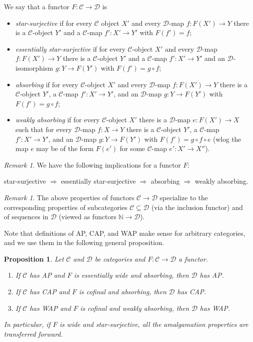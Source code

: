 \documentclass[oneside,notitlepage,12pt]{article}
\newtheorem{prop}[tw]{Proposition}
\theoremstyle{definition}
\theoremstyle{remark}
\newtheorem{uwgi}[tw]{Remark}
\newcommand \maps {\colon} %
\newcommand \cmp {\circ} %
\newcommand \N {\mathbb{N}}
\newcommand \C {\mathscr{C}}
\newcommand \D {\mathscr{D}}
\begin{document}
\noindent
We say that a functor $F\colon \C\to\D$  is
\begin{itemize}
    \item {\it star-surjective} if for every $\C$ object $X'$ and every $\D$-map $f\colon F(X')\to Y$ there is a $\C$-object $Y'$ and a $\C$-map $f'\colon X'\to Y'$ with $F(f')=f$;
    
	\item {\it essentially star-surjective} if for every $\C$-object $X'$ and every $\D$-map $f\maps F(X') \to Y$ there is a $\C$-object $Y'$ and a $\C$-map $f'\maps X' \to Y'$ and an $\D$-isomorphism $g\maps Y \to F(Y')$ with $F(f') = g \circ f$;
    
    \item {\it absorbing} if for every $\C$-object $X'$ and every $\D$-map $f\maps F(X') \to Y$ there is a $\C$-object $Y'$, a $\C$-map $f'\maps X' \to Y'$, and an $\D$-map $g\maps Y \to F(Y')$ with $F(f') = g \cmp f$;  
    
	\item {\it weakly absorbing} if for every $\C$-object $X'$ there is a $\D$-map $e\maps F(X') \to X$ such that for every $\D$-map $f\maps X \to Y$ there is a $\C$-object $Y'$, a $\C$-map $f'\maps X' \to Y'$, and an $\D$-map $g\maps Y \to F(Y')$ with $F(f') = g \circ f \circ e$ (wlog the map $e$ may be of the form $F(e')$ for some $\C$-map $e'\maps X' \to X''$).
\end{itemize}

\begin{uwgi}
We have the following implications for a functor $F$:

\smallskip
\centerline{star-surjective $\Rightarrow$ essentially star-surjective $\Rightarrow$ absorbing $\Rightarrow$ weakly absorbing.}
\end{uwgi}



\begin{uwgi}
    The above properties of functors $\C \to \D$ specialize to the corresponding properties of subcategories $\C \subseteq \D$ (via the inclusion functor) and of sequences in $\D$ (viewed as functors $\N \to \D$).
\end{uwgi}



Note that definitions of AP, CAP, and WAP make sense for arbitrary categories, and we use them in the following general proposition.

\begin{prop} \label{thm:fin_transfer}
    Let $\C$ and $\D$ be categories and $F\maps \C \to \D$ a functor.
    \begin{enumerate}
        \item If $\C$ has AP and $F$ is essentially wide and absorbing, then $\D$ has AP.
        \item If $\C$ has CAP and $F$ is cofinal and absorbing, then $\D$ has CAP.
        \item If $\C$ has WAP and $F$ is cofinal and weakly absorbing, then $\D$ has WAP.
    \end{enumerate}
    In particular, if $F$ is wide and star-surjective, all the amalgamation properties are transferred forward.
\end{prop}
\end{document}

